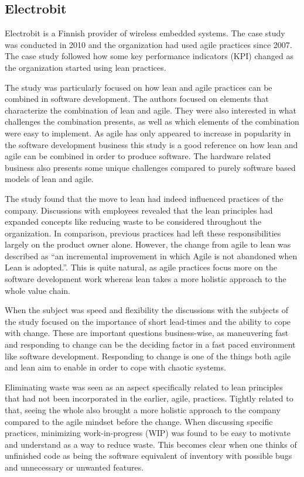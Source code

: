 \subsection{Electrobit}
\label{electrobit}

Electrobit is a Finnish provider of wireless embedded systems. The case study was conducted in 2010 and the organization had used agile practices since 2007. The case study followed how some key performance indicators (KPI) changed as the organization started using lean practices. \cite{Rodriguez2014Combining}

The study was particularly focused on how lean and agile practices can be combined in software development. The authors focused on elements that characterize the combination of lean and agile. They were also interested in what challenges the combination presents, as well as which elements of the combination were easy to implement.\cite{Rodriguez2014Combining} As agile has only appeared to increase in popularity in the software development business this study is a good reference on how lean and agile can be combined in order to produce software. The hardware related business also presents some unique challenges compared to purely software based models of lean and agile.

The study found that the move to lean had indeed influenced practices of the company. Discussions with employees revealed that the lean principles had expanded concepts like reducing waste to be considered throughout the organization. In comparison, previous practices had left these responsibilities largely on the product owner alone. However, the change from agile to lean was described as ``an incremental improvement in which Agile is not abandoned when Lean is adopted.''\cite{Rodriguez2014Combining}. This is quite natural, as agile practices focus more on the software development work whereas lean takes a more holistic approach to the whole value chain.

When the subject was speed and flexibility the discussions with the subjects of the study focused on the importance of short lead-times and the ability to cope with change.\cite{Rodriguez2014Combining} These are important questions business-wise, as maneuvering fast and responding to change can be the deciding factor in a fast paced environment like software development. Responding to change is one of the things both agile and lean aim to enable in order to cope with chaotic systems.

Eliminating waste was seen as an aspect specifically related to lean principles that had not been incorporated in the earlier, agile, practices. Tightly related to that, seeing the whole also brought a more holistic approach to the company compared to the agile mindset before the change. When discussing specific practices, minimizing work-in-progress (WIP) was found to be easy to motivate and understand as a way to reduce waste.\cite{Rodriguez2014Combining} This becomes clear when one thinks of unfinished code as being the software equivalent of inventory with possible bugs and unnecessary or unwanted features.

